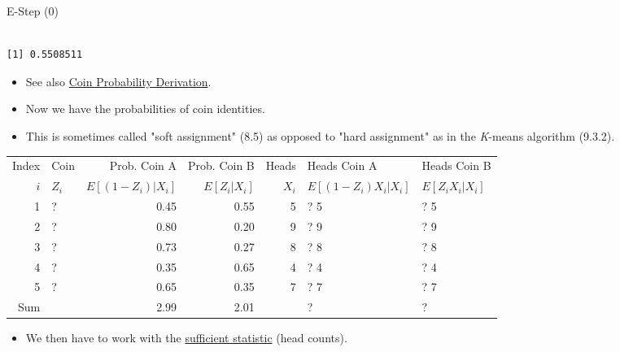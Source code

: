 \documentclass[dvipdfmx,bigger,aspectratio=169]{beamer}
\begin{document}
\begin{frame}[fragile,allowframebreaks,label=,t]{E-Step (0)}
\begin{verbatim}

[1] 0.5508511
\end{verbatim}


\normalsize
\begin{itemize}
\item See also \hyperlink{sec:orgea6feb1}{Coin Probability Derivation}.
\end{itemize}

\newpage
\begin{itemize}
\item Now we have the probabilities of coin identities.
\item This is sometimes called "soft assignment" \cite{hastieElementsStatisticalLearning2016} (8.5) as opposed to "hard assignment" as in the \emph{K}-means algorithm \cite{bishopPatternRecognitionMachine2006} (9.3.2).
\end{itemize}
\footnotesize
\begin{center}
\begin{tabular}{r|l|rr|r|ll|}
Index & Coin & Prob. Coin A & Prob. Coin B & Heads & Heads Coin A & Heads Coin B\\
\(i\) & \(Z_{i}\) & \(E[(1-Z_{i})\vert X_{i}]\) & \(E[Z_{i}\vert X_{i}]\) & \(X_{i}\) & \(E[(1-Z_{i}) X_{i} \vert X_{i}]\) & \(E[Z_{i} X_{i} \vert X_{i}]\)\\
\hline
1 & ? & 0.45 & 0.55 & 5 & ? \texttimes{} 5 & ? \texttimes{} 5\\
2 & ? & 0.80 & 0.20 & 9 & ? \texttimes{} 9 & ? \texttimes{} 9\\
3 & ? & 0.73 & 0.27 & 8 & ? \texttimes{} 8 & ? \texttimes{} 8\\
4 & ? & 0.35 & 0.65 & 4 & ? \texttimes{} 4 & ? \texttimes{} 4\\
5 & ? & 0.65 & 0.35 & 7 & ? \texttimes{} 7 & ? \texttimes{} 7\\
\hline
Sum &  & 2.99 & 2.01 &  & ? & ?\\
\end{tabular}
\end{center}
\normalsize
\begin{itemize}
\item We then have to work with the \href{https://www.statisticshowto.datasciencecentral.com/sufficient-statistic/}{sufficient statistic} (head counts).
\end{itemize}


\end{frame}
\end{document}
